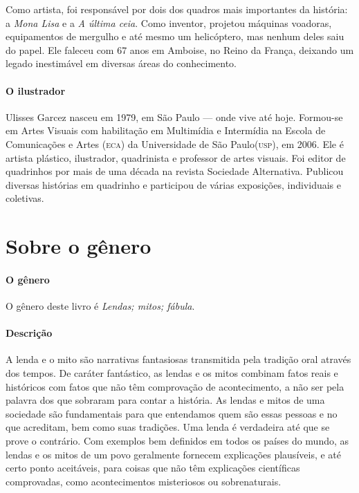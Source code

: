 \documentclass[11pt]{extarticle}
\begin{document}

Como artista, foi responsável por dois dos quadros mais importantes da história: a \textit{Mona Lisa} e a \textit{A última ceia}. Como inventor, projetou máquinas voadoras, equipamentos de mergulho e até mesmo um helicóptero, mas nenhum deles saiu do papel. Ele faleceu com 67 anos em Amboise, no Reino da França, deixando um legado inestimável em diversas áreas do conhecimento.

\paragraph{O ilustrador} Ulisses Garcez nasceu em 1979, em São Paulo --- onde vive até hoje. Formou-se em Artes Visuais com habilitação em Multimídia e Intermídia na Escola de Comunicações e Artes (\textsc{eca}) da Universidade de São Paulo(\textsc{usp}), em 2006. Ele é artista plástico, ilustrador, quadrinista e professor de artes visuais. Foi editor de quadrinhos por mais de uma década na revista Sociedade Alternativa. Publicou diversas histórias em quadrinho e participou de várias exposições, individuais e coletivas.


\section{Sobre o gênero}

\paragraph{O gênero} O gênero deste livro é \textit{Lendas; mitos; fábula}. 

\paragraph{Descrição} A lenda e o mito são narrativas fantasiosas transmitida pela tradição oral através dos tempos. De caráter fantástico, as lendas e os mitos combinam fatos reais e históricos com fatos que não têm comprovação de acontecimento, a não ser pela palavra dos que sobraram para contar a história. As lendas e mitos de uma sociedade são fundamentais para que entendamos quem são essas pessoas e no que acreditam, bem como suas tradições. Uma lenda é verdadeira até que se prove o contrário. Com exemplos bem definidos em todos os países do mundo, as lendas e os mitos de um povo geralmente fornecem explicações plausíveis, e até certo ponto aceitáveis, para coisas que não têm explicações científicas comprovadas, como acontecimentos misteriosos ou sobrenaturais.
\end{document}
